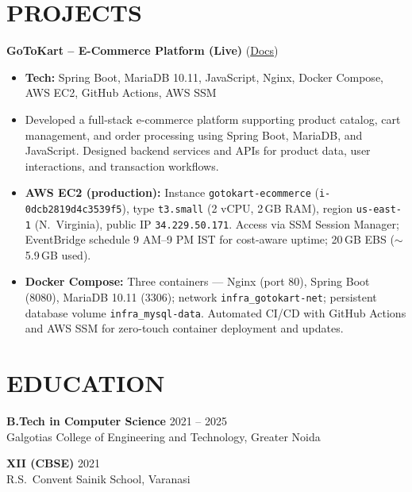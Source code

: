 \documentclass[10pt,letterpaper]{article}
\begin{document}
\section*{PROJECTS}
\textbf{GoToKart -- E-Commerce Platform (Live)} \textbar{} (\href{https://gotokart.github.io/docs/}{Docs})
\begin{itemize}
\item \textbf{Tech:} Spring Boot, MariaDB 10.11, JavaScript, Nginx, Docker Compose, AWS EC2, GitHub Actions, AWS SSM
\item Developed a full-stack e-commerce platform supporting product catalog, cart management, and order processing using Spring Boot, MariaDB, and JavaScript. Designed backend services and APIs for product data, user interactions, and transaction workflows.
\item \textbf{AWS EC2 (production):} Instance \texttt{gotokart-ecommerce} (\texttt{i-0dcb2819d4c3539f5}), type \texttt{t3.small} (2 vCPU, 2\,GB RAM), region \texttt{us-east-1} (N.\ Virginia), public IP \texttt{34.229.50.171}. Access via SSM Session Manager; EventBridge schedule 9 AM--9 PM IST for cost-aware uptime; 20\,GB EBS ($\sim$5.9\,GB used).
\item \textbf{Docker Compose:} Three containers --- Nginx (port 80), Spring Boot (8080), MariaDB 10.11 (3306); network \texttt{infra\_gotokart-net}; persistent database volume \texttt{infra\_mysql-data}. Automated CI/CD with GitHub Actions and AWS SSM for zero-touch container deployment and updates.
\end{itemize}

\section*{EDUCATION}
\textbf{B.Tech in Computer Science} \hfill 2021 -- 2025\\
Galgotias College of Engineering and Technology, Greater Noida

\textbf{XII (CBSE)} \hfill 2021\\
R.S.\ Convent Sainik School, Varanasi
\end{document}
